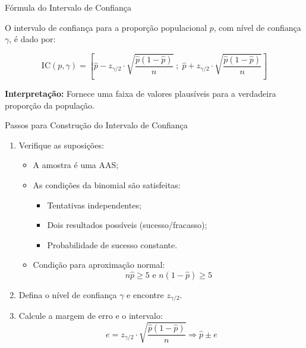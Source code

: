 \documentclass[14pt,aspectratio=1610]{beamer}
\begin{document}
	\begin{frame}{Fórmula do Intervalo de Confiança}
		\begin{block}{}
			\justifying
			O intervalo de confiança para a proporção populacional $p$, com nível de confiança $\gamma$, é dado por:
			
			\[
			\text{IC}(p, \gamma) =
			\left[
			\hat{p} - z_{\gamma/2} \cdot \sqrt{\frac{\hat{p}(1 - \hat{p})}{n}} \; ; \;
			\hat{p} + z_{\gamma/2} \cdot \sqrt{\frac{\hat{p}(1 - \hat{p})}{n}}
			\right]
			\]
			
			\textbf{Interpretação:} Fornece uma faixa de valores plausíveis para a verdadeira proporção da população.
		\end{block}
	\end{frame}
	
	\begin{frame}{Passos para Construção do Intervalo de Confiança}
		\footnotesize
		\vspace{-0.5cm}
		\begin{block}{}
			\justifying
			\begin{enumerate}
				\item Verifique as suposições:
				\begin{itemize}
					\item A amostra é uma AAS;
					\item As condições da binomial são satisfeitas:
					\begin{itemize}
						\item Tentativas independentes;
						\item Dois resultados possíveis (sucesso/fracasso);
						\item Probabilidade de sucesso constante.
					\end{itemize}
					\item Condição para aproximação normal:
					\[
					n\hat{p} \geq 5 \text{ e } n(1 - \hat{p}) \geq 5
					\]
				\end{itemize}
				
				\item Defina o nível de confiança $\gamma$ e encontre $z_{\gamma/2}$.
				
				\item Calcule a margem de erro e o intervalo:
				\[
				e = z_{\gamma/2} \cdot \sqrt{\frac{\hat{p}(1 - \hat{p})}{n}}\Rightarrow 
				\hat{p} \pm e
				\]
			\end{enumerate}
		\end{block}
	\end{frame}
	
\end{document}
